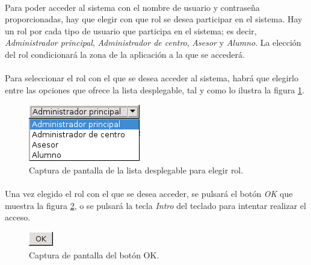   \paragraph{}Para poder acceder al sistema con el nombre de usuario y
  contraseña proporcionadas, hay que elegir con que rol se desea participar en
  el sistema. Hay un rol por cada tipo de usuario que participa en el sistema;
  es decir, \textit{Administrador principal}, \textit{Administrador de centro},
  \textit{Asesor} y \textit{Alumno}. La elección del rol condicionará la zona de
  la aplicación a la que se accederá.

  \paragraph{}Para seleccionar el rol con el que se desea acceder al sistema,
  habrá que elegirlo entre las opciones que ofrece la lista desplegable, tal y
  como lo ilustra la figura \ref{capturaListaDesplegableRol}.

  \begin{figure}[!ht]
    \begin{center}
      \includegraphics[scale=0.6]{4.Funcionamiento_Aplicacion/4.2.Acceso_Sistema/Capturas/lista_desplegable_rol.png}
      \caption{Captura de pantalla de la lista desplegable para elegir rol.}
      \label{capturaListaDesplegableRol}
    \end{center}
  \end{figure}

  \paragraph{}Una vez elegido el rol con el que se desea acceder, se pulsará
  el botón \textit{OK} que muestra la figura \ref{capturaBotonOK}, o se pulsará
  la tecla \textit{Intro} del teclado para intentar realizar el acceso.

  \begin{figure}[!ht]
    \begin{center}
      \includegraphics[scale=0.6]{4.Funcionamiento_Aplicacion/4.2.Acceso_Sistema/Capturas/boton_ok.png}
      \caption{Captura de pantalla del botón OK.}
      \label{capturaBotonOK}
    \end{center}
  \end{figure}

